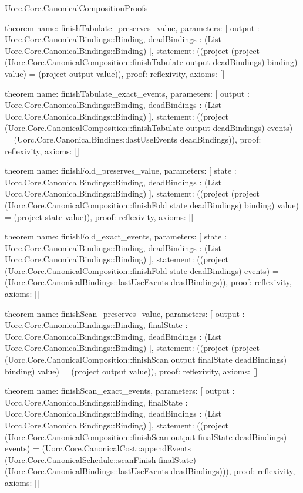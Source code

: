 \begin{lexlean}{Uorc.Core.CanonicalCompositionProofs}
\begin{semanticmodule}
theorem{
  name: finishTabulate_preserves_value,
  parameters: [
    output : Uorc.Core.CanonicalBindings::Binding,
    deadBindings : (List Uorc.Core.CanonicalBindings::Binding)
  ],
  statement: ((project (project (Uorc.Core.CanonicalComposition::finishTabulate output deadBindings) binding) value) = (project output value)),
  proof: reflexivity{},
  axioms: []
}

theorem{
  name: finishTabulate_exact_events,
  parameters: [
    output : Uorc.Core.CanonicalBindings::Binding,
    deadBindings : (List Uorc.Core.CanonicalBindings::Binding)
  ],
  statement: ((project (Uorc.Core.CanonicalComposition::finishTabulate output deadBindings) events) = (Uorc.Core.CanonicalBindings::lastUseEvents deadBindings)),
  proof: reflexivity{},
  axioms: []
}

theorem{
  name: finishFold_preserves_value,
  parameters: [
    state : Uorc.Core.CanonicalBindings::Binding,
    deadBindings : (List Uorc.Core.CanonicalBindings::Binding)
  ],
  statement: ((project (project (Uorc.Core.CanonicalComposition::finishFold state deadBindings) binding) value) = (project state value)),
  proof: reflexivity{},
  axioms: []
}

theorem{
  name: finishFold_exact_events,
  parameters: [
    state : Uorc.Core.CanonicalBindings::Binding,
    deadBindings : (List Uorc.Core.CanonicalBindings::Binding)
  ],
  statement: ((project (Uorc.Core.CanonicalComposition::finishFold state deadBindings) events) = (Uorc.Core.CanonicalBindings::lastUseEvents deadBindings)),
  proof: reflexivity{},
  axioms: []
}

theorem{
  name: finishScan_preserves_value,
  parameters: [
    output : Uorc.Core.CanonicalBindings::Binding,
    finalState : Uorc.Core.CanonicalBindings::Binding,
    deadBindings : (List Uorc.Core.CanonicalBindings::Binding)
  ],
  statement: ((project (project (Uorc.Core.CanonicalComposition::finishScan output finalState deadBindings) binding) value) = (project output value)),
  proof: reflexivity{},
  axioms: []
}

theorem{
  name: finishScan_exact_events,
  parameters: [
    output : Uorc.Core.CanonicalBindings::Binding,
    finalState : Uorc.Core.CanonicalBindings::Binding,
    deadBindings : (List Uorc.Core.CanonicalBindings::Binding)
  ],
  statement: ((project (Uorc.Core.CanonicalComposition::finishScan output finalState deadBindings) events) = (Uorc.Core.CanonicalCost::appendEvents (Uorc.Core.CanonicalSchedule::scanFinish finalState) (Uorc.Core.CanonicalBindings::lastUseEvents deadBindings))),
  proof: reflexivity{},
  axioms: []
}
\end{semanticmodule}
\end{lexlean}
